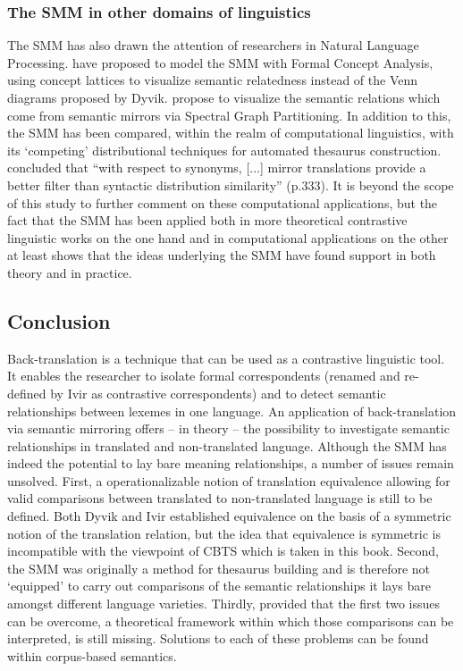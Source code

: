 \subsubsection{The SMM in other domains of linguistics}
\label{sec:2.3.4.5}  
The SMM has also drawn the attention of researchers in Natural Language Processing. \citet{ganter_conceptual_2005} have proposed to model the SMM with Formal Concept Analysis, using concept lattices to visualize semantic relatedness instead of the Venn diagrams proposed by Dyvik. \citet{elden_computing_2013} propose to visualize the semantic relations which come from semantic mirrors via Spectral Graph Partitioning. In addition to this, the SMM has been compared, within the realm of computational linguistics, with its ‘competing’ distributional techniques for automated thesaurus construction. \citet{butz_comparing_2011} concluded that “with respect to synonyms, [...] mirror translations provide a better filter than syntactic distribution similarity” (p.333). It is beyond the scope of this study to further comment on these computational applications, but the fact that the SMM has been applied both in more theoretical contrastive linguistic works on the one hand and in computational applications on the other at least shows that the ideas underlying the SMM have found support in both theory and in practice.

\subsection{Conclusion}
\label{sec:2.3.5}  
Back-translation is a technique that can be used as a contrastive linguistic tool. It enables the researcher to isolate formal correspondents (renamed and re-defined by Ivir as contrastive correspondents) and to detect semantic relationships between lexemes in one language. An application of back-translation via semantic mirroring offers – in theory – the possibility to investigate semantic relationships in translated and non-translated language. Although the SMM has indeed the potential to lay bare meaning relationships, a number of issues remain unsolved. First, a operationalizable notion of translation equivalence allowing for valid comparisons between translated to non-translated language is still to be defined. Both Dyvik and Ivir established equivalence on the basis of a symmetric notion of the translation relation, but the idea that equivalence is symmetric is incompatible with the viewpoint of CBTS which is taken in this book. Second, the SMM was originally a method for thesaurus building and is therefore not ‘equipped’ to carry out comparisons of the semantic relationships it lays bare amongst different language varieties. Thirdly, provided that the first two issues can be overcome, a theoretical framework within which those comparisons can be interpreted, is still missing. Solutions to each of these problems can be found within corpus-based semantics.

